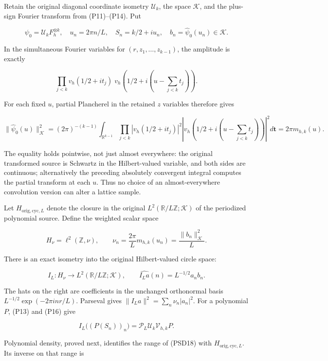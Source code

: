 Retain the original diagonal coordinate isometry \(\mathcal U_k\), the space \(\mathcal K\), and the plus-sign Fourier transform from (P11)--(P14). Put

\[
\psi_0=\mathcal U_kF_h^{\otimes k},\quad
u_n=2\pi n/L,\quad S_n=k/2+iu_n,\quad
b_n=\widehat\psi_0(u_n)\in\mathcal K.
\]

In the simultaneous Fourier variables for \((r,z_1,\ldots,z_{k-1})\), the amplitude is exactly

\[
\prod_{j<k}v_h(1/2+it_j)\;
v_h\left(1/2+i\left(u-\sum_{j<k}t_j\right)\right).
\]

For each fixed \(u\), partial Plancherel in the retained \(z\) variables therefore gives

\[
\|\widehat\psi_0(u)\|_{\mathcal K}^2
=(2\pi)^{-(k-1)}\int_{\mathbb{R}^{k-1}}
\prod_{j<k}|v_h(1/2+it_j)|^2
\left|v_h\left(1/2+i\left(u-\sum_{j<k}t_j\right)\right)\right|^2d\mathbf t
=2\pi m_{h,k}(u).
\tag{PSD16}
\]

The equality holds pointwise, not just almost everywhere: the original transformed source is Schwartz in the Hilbert-valued variable, and both sides are continuous; alternatively the preceding absolutely convergent integral computes the partial transform at each \(u\). Thus no choice of an almost-everywhere convolution version can alter a lattice sample.

Let \(H_{\mathrm{orig,cyc},L}\) denote the closure in the original \(L^2(\mathbb{R}/L\mathbb Z;\mathcal K)\) of the periodized polynomial source. Define the weighted scalar space

\[
H_\nu=\ell^2(\mathbb Z,\nu),\qquad
\nu_n=\frac{2\pi}{L}m_{h,k}(u_n)=\frac{\|b_n\|_{\mathcal K}^2}{L}.
\tag{PSD17}
\]

There is an exact isometry into the original Hilbert-valued circle space:

\[
I_L:H_\nu\longrightarrow L^2(\mathbb{R}/L\mathbb Z;\mathcal K),
\qquad \widehat{I_La}(n)=L^{-1/2}a_nb_n.
\tag{PSD18}
\]

The hats on the right are coefficients in the unchanged orthonormal basis \(L^{-1/2}\exp(-2\pi i nr/L)\). Parseval gives \(\|I_La\|^2=\sum_n\nu_n|a_n|^2\). For a polynomial \(P\), (P13) and (P16) give

\[
I_L\bigl((P(S_n))_n\bigr)
=\mathcal P_L\mathcal U_k\mathcal V_{h,k}P.
\tag{PSD19}
\]

Polynomial density, proved next, identifies the range of (PSD18) with \(H_{\mathrm{orig,cyc},L}\). Its inverse on that range is

